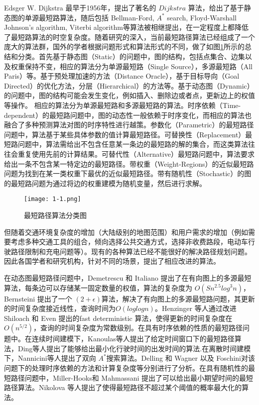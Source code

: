 \documentclass{standalone}
\begin{document}
Edsger W. Dijkstra 最早于1956年，提出了著名的 $Dijkstra$ 算法，给出了基于静态图的单源最短路算法，随后包括 Bellman-Ford, $A^*$ search, Floyd-Warshall Johnson's algorithm, Viterbi algorithm等算法被相继提出，在一定程度上都降低了最短路算法的时空复杂度。随着研究的深入，当前最短路径算法已经组成了一个庞大的算法群，国外的学者根据问题形式和算法形式的不同，做了如图\ref{1-1}所示的总结和分类。首先基于静态图（Static）的问题中，图的结构，包括点集合、边集以及权重保持不变，相应的算法分为单源最短路（Single Source），多源最短路（All Paris）等。基于预处理加速的方法（Distance Oracle），基于目标导向（Goal Directed）的优化方法，分层（Hierarchical）的方法等。基于动态图（Dynamic）的问题中，图的结构可能会发生变化，例如插入、删除边或者点，更新边上的权值等操作。 相应的算法分为单源最短路和多源最短路的算法。时序依赖（Time-dependent）的最短路问题中，图的动态性一般依赖于时序变化，而相应的算法也融合了多种预测算法对图的时序特性进行越策。参数化（Parametric）的最短路径问题中，算法基于某些具体参数的值计算最短路径。可替换性（Replacement）最短路问题中，算法需给出不包含任意某一条边的最短路的解的集合，而这类算法往往会重复使用先前的计算结果。可替代性（Alternative）最短路问题中，算法要求给出一条不包含某一特定边的最短路径。带权重（Weight-Regions）的近似最短路问题为找到在某一类权重下最优的近似最短路径。带有随机性（Stochastic）的图的最短路问题为通过将边的权重建模为随机变量，然后进行求解。\par
\begin{figure}[H]
	\texttt{[image: 1-1.png]}
	\caption{最短路径算法分类图}
	\label{1-1}
\end{figure}

但随着交通环境复杂度的增加（大陆级别的地图范围）和用户需求的增加（例如需要考虑多种交通工具的组合，倾向选择公共交通方式，选择非收费路段，电动车行驶路径限制和充电问题等）。现有的各种算法已经不能很好的解决路径规划问题。因此各国学者和研究机构，针对不同的场景，提出了相应改进的算法。\par

在动态图最短路径问题中，Demetrescu 和 Italiano 提出了在有向图上的多源最短算法，每条边可以存储某一固定数量的权值，算法的复杂度为 $O(Sn^{2.5}log^3n)$，Bernsteini 提出了一个 $(2+\epsilon)$算法，解决了有向图上的多源最短路问题，其更新的时间复杂度接近线性，查询时间为$O(loglogn)$。Henzinger 等人通过改进 Shiloach 和 Even 提出的fast deterministic 算法，使得更新的时间复杂度在$O(n^{5/2})$，查询的时间复杂度为常数级别。在具有时序依赖的性质的最短路径问题中。在连续时间建模下，Kanoulas等人提出了给定时间窗口下的最短路径算法，Ding等人提出了能够给出最小化行驶时间的出发时间的算法.在离散时间建模下，Nannicini等人提出了双向 $A^*$搜索算法。Delling 和 Wagner 以及 Foschini对该问题下的处理时序依赖的方法和计算复杂度等分别进行了分析。在具有随机性的最短路径问题中，Miller-Hooks和 Mahmassani 提出了可以给出最小期望时间的最短路径算法。Nikolova 等人提出了使得最短路径不超过某个阈值的概率最大化的算法。
\end{document}
